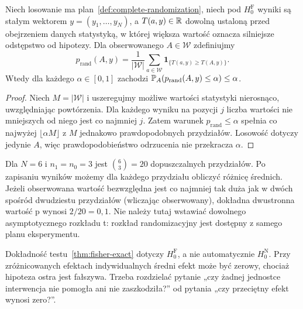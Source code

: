\begin{twierdzenie}\label{thm:fisher-exact}
Niech losowanie ma plan~\ref{def:complete-randomization}, niech pod $H_0^{\mathrm F}$ wyniki są stałym wektorem $y=(y_1,\ldots,y_N)$, a $T(a,y)\in\mathbb R$ dowolną ustaloną przed obejrzeniem danych statystyką, w której większa wartość oznacza silniejsze odstępstwo od hipotezy. Dla obserwowanego $A\in\mathcal W$ zdefiniujmy
\[
 p_{\mathrm{rand}}(A,y)=\frac1{|\mathcal W|}\sum_{a\in\mathcal W}\mathbf 1_{\{T(a,y)\ge T(A,y)\}}.
\]
Wtedy dla każdego $\alpha\in[0,1]$ zachodzi $\mathbb P_A(p_{\mathrm{rand}}(A,y)\le\alpha)\le\alpha$.
\end{twierdzenie}
\begin{proof}
Niech $M=|\mathcal W|$ i uszeregujmy możliwe wartości statystyki nierosnąco, uwzględniając powtórzenia. Dla każdego wyniku na pozycji $j$ liczba wartości nie mniejszych od niego jest co najmniej $j$. Zatem warunek $p_{\mathrm{rand}}\le\alpha$ spełnia co najwyżej $\lfloor\alpha M\rfloor$ z $M$ jednakowo prawdopodobnych przydziałów. Losowość dotyczy jedynie $A$, więc prawdopodobieństwo odrzucenia nie przekracza $\alpha$.
\end{proof}

\begin{przyklad}
Dla $N=6$ i $n_1=n_0=3$ jest $\binom63=20$ dopuszczalnych przydziałów. Po zapisaniu wyników możemy dla każdego przydziału obliczyć różnicę średnich. Jeżeli obserwowana wartość bezwzględna jest co najmniej tak duża jak w dwóch spośród dwudziestu przydziałów (wliczając obserwowany), dokładna dwustronna wartość p wynosi $2/20=0{,}1$. Nie należy tutaj wstawiać dowolnego asymptotycznego rozkładu t: rozkład randomizacyjny jest dostępny z samego planu eksperymentu.
\end{przyklad}

\begin{uwaga}
Dokładność testu~\ref{thm:fisher-exact} dotyczy $H_0^{\mathrm F}$, a nie automatycznie $H_0^{\mathrm N}$. Przy zróżnicowanych efektach indywidualnych średni efekt może być zerowy, chociaż hipoteza ostra jest fałszywa. Trzeba rozdzielać pytanie „czy żadnej jednostce interwencja nie pomogła ani nie zaszkodziła?” od pytania „czy przeciętny efekt wynosi zero?”.
\end{uwaga}

